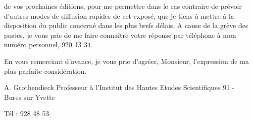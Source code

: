 de vos prochaines éditions, pour me permettre dans le cas contraire de
prévoir d'autres modes de diffusion rapides de cet exposé, que je tiens
à mettre à la disposition du public concerné dans les plus brefs délais.
A cause de la grève des postes, je vous prie de me faire connaître votre
réponse par téléphone à mon numéro personnel, 920 13 34.

En vous remerciant d'avance, je vous prie d'agréer, Monsieur,
l'expression de ma plus parfaite considération.


A. Grothendieck
Professeur à l'Institut des
Hautes Etudes Scientifiques
91 - Bures sur Yvette

Tél : 928 48 53

